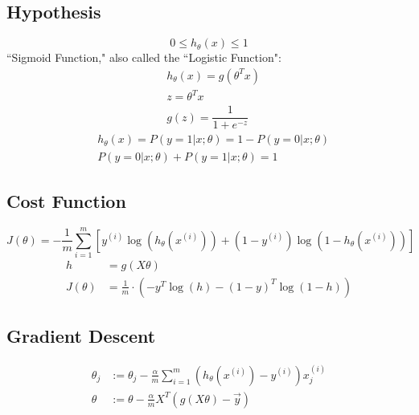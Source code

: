 \subsection{Hypothesis}
\begin{equation}
0 \leq h_\theta (x) \leq 1
\end{equation}
``Sigmoid Function," also called the ``Logistic Function":
\begin{align}
& h_\theta (x) =  g ( \theta^T x ) \\& z = \theta^T x \\& g(z) = \dfrac{1}{1 + e^{-z}}
\end{align}
\begin{align}
& h_\theta(x) = P(y=1 | x ; \theta) = 1 - P(y=0 | x ; \theta) \\& 
P(y = 0 | x;\theta) + P(y = 1 | x ; \theta) = 1
\end{align}
\subsection{Cost Function}
\begin{equation}
J(\theta) = - \frac{1}{m} \displaystyle \sum_{i=1}^m [y^{(i)}\log (h_\theta (x^{(i)})) + (1 - y^{(i)})\log (1 - h_\theta(x^{(i)}))]
\end{equation}
\begin{align}
h &= g(X\theta)\\
J(\theta)  &= \frac{1}{m} \cdot \left(-y^{T}\log(h)-(1-y)^{T}\log(1-h)\right)
\end{align}
\subsection{Gradient Descent}
\begin{align}
\theta_j &:= \theta_j - \frac{\alpha}{m} \sum_{i=1}^m (h_\theta(x^{(i)}) - y^{(i)}) x_j^{(i)} \\
\theta &:= \theta - \frac{\alpha}{m} X^{T} (g(X \theta ) - \vec{y})
\end{align}